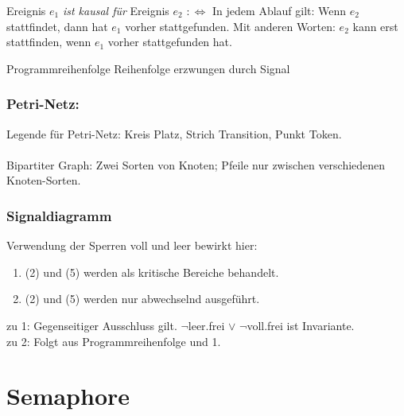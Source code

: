 Ereignis $ e_1 $ \emph{ist kausal für} Ereignis $ e_2 $ $ :\Leftrightarrow $ In jedem Ablauf gilt: Wenn $ e_2 $ stattfindet, dann hat $ e_1 $ vorher stattgefunden. Mit anderen Worten: $ e_2 $ kann erst stattfinden, wenn $ e_1 $ vorher stattgefunden hat.

Programmreihenfolge
Reihenfolge erzwungen durch Signal

\subsubsection*{Petri-Netz:} %
Legende für Petri-Netz: Kreis Platz, Strich Transition, Punkt Token.\\
\\
Bipartiter Graph: Zwei Sorten von Knoten; Pfeile nur zwischen verschiedenen Knoten-Sorten.

\subsubsection*{Signaldiagramm}


Verwendung der Sperren voll und leer bewirkt hier:
\begin{enumerate}
\item (2) und (5) werden als kritische Bereiche behandelt. 
\item (2) und (5) werden nur abwechselnd ausgeführt.
\end{enumerate}
zu 1: Gegenseitiger Ausschluss gilt. $ \neg $leer.frei $\lor$ $\neg$voll.frei ist Invariante.\\
zu 2: Folgt aus Programmreihenfolge und 1.

\section{Semaphore}


